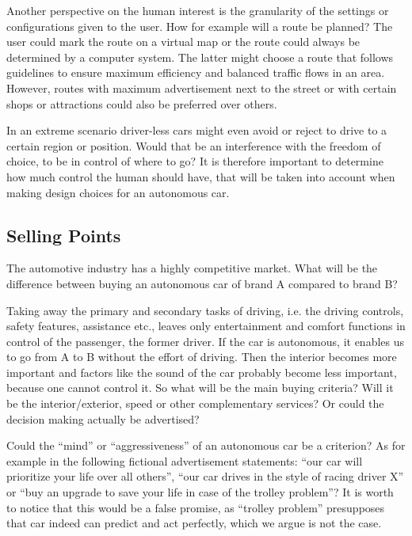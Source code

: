 Another perspective on the human interest is the granularity of the settings or configurations given to the user. How for example will a route be planned? The user could mark the route on a virtual map or the route could always be determined by a computer system. The latter might choose a route that follows guidelines to ensure maximum efficiency and balanced traffic flows in an area. However, routes with maximum advertisement next to the street or with certain shops or attractions could also be preferred over others. 

In an extreme scenario driver-less cars might even avoid or reject to drive to a certain region or position. Would that be an interference with the freedom of choice, to be in control of where to go? It is therefore important to determine how much control the human should have, that will be taken into account when making design choices for an autonomous car. 


\subsection{Selling Points}
\label{sec:EAofNONTC:SellingPoints}

The automotive industry has a highly competitive market. What will be the difference between buying an autonomous car of brand A compared to brand B? 

Taking away the primary and secondary tasks of driving, i.e. the driving controls, safety features, assistance etc., leaves only entertainment and comfort functions in control of the passenger, the former driver. If the car is autonomous, it enables us to go from A to B without the effort of driving. Then the interior becomes more important and factors like the sound of the car probably become less important, because one cannot control it. So what will be the main buying criteria? Will it be the interior/exterior, speed or other complementary services? Or could the decision making actually be advertised? 

Could the \enquote{mind} or \enquote{aggressiveness} of an autonomous car be a criterion? As for example in the following fictional advertisement statements: \enquote{our car will prioritize your life over all others}, \enquote{our car drives in the style of racing driver X} or \enquote{buy an upgrade to save your life in case of the trolley problem}? It is worth to notice that this would be a false promise, as \enquote{trolley problem} presupposes that car indeed can predict and act perfectly, which we argue is not the case.

